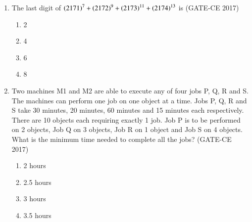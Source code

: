\documentclass[journal,12pt,onecolumn]{article}
\theoremstyle{remark}
\begin{document}
\begin{enumerate}
    \item The last digit of $\left(2171\right)^7 + \left(2172\right)^9 + \left(2173\right)^{11} + \left(2174\right)^{13}$ is \hfill (GATE-CE 2017)
    \begin{multicols}{4}
    \begin{enumerate}
        \item 2
        \item 4
        \item 6
        \item 8
    \end{enumerate}
    \end{multicols}

    \item Two machines M1 and M2 are able to execute any of four jobs P, Q, R and S. The machines can perform one job on one object at a time. Jobs P, Q, R and S take 30 minutes, 20 minutes, 60 minutes and 15 minutes each respectively. There are 10 objects each requiring exactly 1 job. Job P is to be performed on 2 objects, Job Q on 3 objects, Job R on 1 object and Job S on 4 objects. What is the minimum time needed to complete all the jobs? \hfill (GATE-CE 2017)
    \begin{multicols}{4}
    \begin{enumerate}
        \item 2 hours
        \item 2.5 hours
        \item 3 hours
        \item 3.5 hours
    \end{enumerate}
    \end{multicols}


\end{enumerate}
\end{document}
